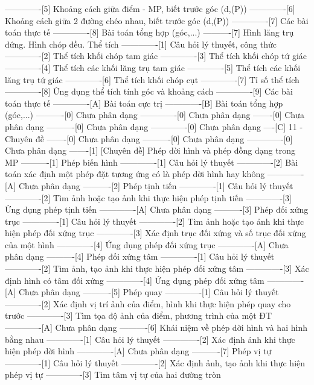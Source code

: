 -------------[5] Khoảng cách giữa điểm - MP, biết trước góc (d,(P))
-------------[6] Khoảng cách giữa 2 đường chéo nhau, biết trước góc (d,(P))
-------------[7] Các bài toán thực tế
-------------[8] Bài toán tổng hợp (góc,...)
----------[7] Hình lăng trụ đứng. Hình chóp đều. Thể tích
-------------[1] Câu hỏi lý thuyết, công thức
-------------[2] Thể tích khối chóp tam giác
-------------[3] Thể tích khối chóp tứ giác
-------------[4] Thể tích các khối lăng trụ tam giác
-------------[5] Thể tích các khối lăng trụ tứ giác
-------------[6] Thể tích khối chóp cụt
-------------[7] Tỉ số thể tích
-------------[8] Ứng dụng thể tích tính góc và khoảng cách
-------------[9] Các bài toán thực tế
-------------[A] Bài toán cực trị
-------------[B] Bài toán tổng hợp (góc,...)
----------[0] Chưa phân dạng
-------------[0] Chưa phân dạng
-------[0] Chưa phân dạng
----------[0] Chưa phân dạng
-------------[0] Chưa phân dạng
----[C] 11 - Chuyên đề
-------[0] Chưa phân dạng
----------[0] Chưa phân dạng
-------------[0] Chưa phân dạng
-------[1] [Chuyên đề] Phép dời hình và phép đồng dạng trong MP
----------[1] Phép biến hình
-------------[1] Câu hỏi lý thuyết
-------------[2] Bài toán xác định một phép đặt tương ứng có là phép dời hình hay không
-------------[A] Chưa phân dạng
----------[2] Phép tịnh tiến
-------------[1] Câu hỏi lý thuyết
-------------[2] Tìm ảnh hoặc tạo ảnh khi thực hiện phép tịnh tiến
-------------[3] Ứng dụng phép tịnh tiến
-------------[A] Chưa phân dạng
----------[3] Phép đối xứng trục
-------------[1] Câu hỏi lý thuyết
-------------[2] Tìm ảnh hoặc tạo ảnh khi thực hiện phép đối xứng trục
-------------[3] Xác định trục đối xứng và số trục đối xứng của một hình
-------------[4] Ứng dụng phép đối xứng trục
-------------[A] Chưa phân dạng
----------[4] Phép đối xứng tâm
-------------[1] Câu hỏi lý thuyết
-------------[2] Tìm ảnh, tạo ảnh khi thực hiện phép đối xứng tâm
-------------[3] Xác định hình có tâm đối xứng
-------------[4] Ứng dụng phép đối xứng tâm
-------------[A] Chưa phân dạng
----------[5] Phép quay
-------------[1] Câu hỏi lý thuyết
-------------[2] Xác định vị trí ảnh của điểm, hình khi thực hiện phép quay cho trước
-------------[3] Tìm tọa độ ảnh của điểm, phương trình của một ĐT
-------------[A] Chưa phân dạng
----------[6] Khái niệm về phép dời hình và hai hình bằng nhau
-------------[1] Câu hỏi lý thuyết
-------------[2] Xác định ảnh khi thực hiện phép dời hình
-------------[A] Chưa phân dạng
----------[7] Phép vị tự
-------------[1] Câu hỏi lý thuyết
-------------[2] Xác định ảnh, tạo ảnh khi thực hiện phép vị tự
-------------[3] Tìm tâm vị tự của hai đường tròn
